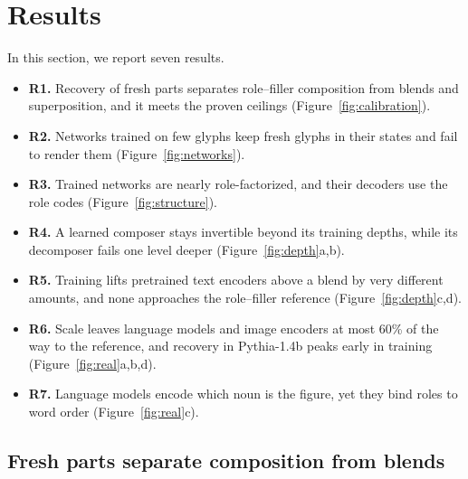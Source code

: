 \section{Results}
\label{sec:results}

In this section, we report seven results.
\begin{itemize}
  \item \textbf{R1.} Recovery of fresh parts separates role--filler composition from blends and superposition, and it meets the proven ceilings (Figure~\ref{fig:calibration}).
  \item \textbf{R2.} Networks trained on few glyphs keep fresh glyphs in their states and fail to render them (Figure~\ref{fig:networks}).
  \item \textbf{R3.} Trained networks are nearly role-factorized, and their decoders use the role codes (Figure~\ref{fig:structure}).
  \item \textbf{R4.} A learned composer stays invertible beyond its training depths, while its decomposer fails one level deeper (Figure~\ref{fig:depth}a,b).
  \item \textbf{R5.} Training lifts pretrained text encoders above a blend by very different amounts, and none approaches the role--filler reference (Figure~\ref{fig:depth}c,d).
  \item \textbf{R6.} Scale leaves language models and image encoders at most 60\% of the way to the reference, and recovery in Pythia-1.4b peaks early in training (Figure~\ref{fig:real}a,b,d).
  \item \textbf{R7.} Language models encode which noun is the figure, yet they bind roles to word order (Figure~\ref{fig:real}c).
\end{itemize}

\subsection{Fresh parts separate composition from blends}
\label{sec:calibration}

